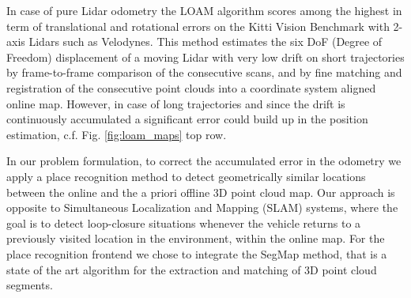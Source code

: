 \documentclass[letterpaper, 10 pt, conference]{ieeeconf}  %
\begin{document}
In case of pure Lidar odometry the LOAM \cite{loam} algorithm scores among the highest in term of translational and rotational errors on the Kitti Vision Benchmark \cite{kitti} with 2-axis Lidars such as Velodynes.
This method estimates the six DoF (Degree of Freedom) displacement of a moving Lidar with very low drift on short trajectories by frame-to-frame comparison of the consecutive scans, and by fine matching and registration of the consecutive point clouds into a coordinate system aligned online map. 
However, in case of long trajectories and since the drift is continuously accumulated a significant error could build up in the position estimation, c.f. Fig. \ref{fig:loam_maps} top row.

In our problem formulation, to correct the accumulated error in the odometry we apply a place recognition method to detect geometrically similar locations between the online and the a priori offline 3D point cloud map. Our approach is opposite to Simultaneous Localization and Mapping (SLAM) systems, where the goal is to detect loop-closure situations whenever the vehicle returns to a previously visited location in the environment, within the online map. For the place recognition frontend we chose to integrate the SegMap \cite{segmap} method, that is a state of the art algorithm for the extraction and matching of 3D point cloud segments. 
\end{document}
